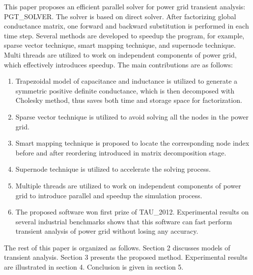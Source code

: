 This paper proposes an efficient parallel solver for power grid transient analysis: PGT\_SOLVER. The solver is based on direct solver. After factorizing global conductance matrix, one forward and backward substitution is performed in each time step. Several methods are developed 
to speedup the program, for example, sparse vector technique, smart mapping technique, and supernode technique. Multi threads are utilized to work on independent components of power grid, which effectively introduces speedup. The main contributions are as follows:
  \begin{enumerate}[1)]
  \item Trapezoidal model of capacitance and inductance is utilized to generate a symmetric positive definite conductance, which is then decomposed with Cholesky method, thus saves both time and storage space for factorization.
  \item Sparse vector technique is utilized to avoid solving all the nodes in the power grid.
  \item Smart mapping technique is proposed to locate the corresponding node index before and after reordering introduced in matrix 		decomposition stage.
  \item Supernode technique is utilized to accelerate the solving process.
  \item Multiple threads are utilized to work on independent components of power grid to introduce parallel and speedup the simulation process.
  \item The proposed software won first prize of TAU\_2012. Experimental results on several industrial benchmarks shows that this software can fast perform transient analysis of power grid without losing any accuracy. 
  \end{enumerate} 

The rest of this paper is organized as follows. Section 2 discusses models of transient analysis. Section 3 presents the proposed method. 
Experimental results are illustrated in section 4. Conclusion is given in section 5.
